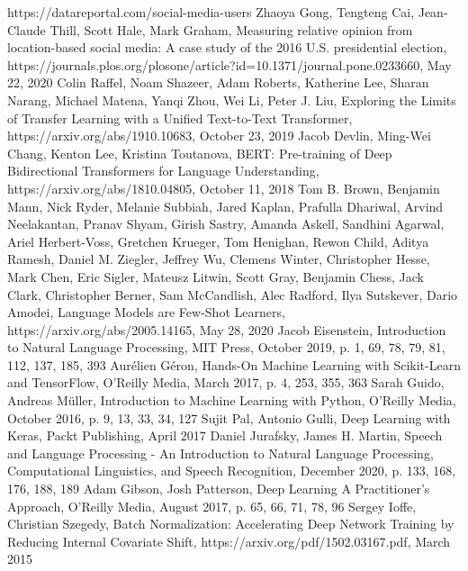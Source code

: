 \documentclass{article}
\begin{document}
\newpage\begin{thebibliography}{10}
https://datareportal.com/social-media-users
Zhaoya Gong, Tengteng Cai, Jean-Claude Thill, Scott Hale, Mark Graham, Measuring relative opinion from location-based social media: A case study of the 2016 U.S. presidential election, https://journals.plos.org/plosone/article?id=10.1371/journal.pone.0233660, May 22, 2020
Colin Raffel, Noam Shazeer, Adam Roberts, Katherine Lee, Sharan Narang, Michael Matena, Yanqi Zhou, Wei Li, Peter J. Liu, Exploring the Limits of Transfer Learning with a Unified Text-to-Text Transformer, https://arxiv.org/abs/1910.10683, October 23, 2019
Jacob Devlin, Ming-Wei Chang, Kenton Lee, Kristina Toutanova, BERT: Pre-training of Deep Bidirectional Transformers for Language Understanding, https://arxiv.org/abs/1810.04805, October 11, 2018
Tom B. Brown, Benjamin Mann, Nick Ryder, Melanie Subbiah, Jared Kaplan, Prafulla Dhariwal, Arvind Neelakantan, Pranav Shyam, Girish Sastry, Amanda Askell, Sandhini Agarwal, Ariel Herbert-Voss, Gretchen Krueger, Tom Henighan, Rewon Child, Aditya Ramesh, Daniel M. Ziegler, Jeffrey Wu, Clemens Winter, Christopher Hesse, Mark Chen, Eric Sigler, Mateusz Litwin, Scott Gray, Benjamin Chess, Jack Clark, Christopher Berner, Sam McCandlish, Alec Radford, Ilya Sutskever, Dario Amodei, Language Models are Few-Shot Learners, https://arxiv.org/abs/2005.14165, May 28, 2020
Jacob Eisenstein, Introduction to Natural Language Processing, MIT Press, October 2019, p. 1, 69, 78, 79, 81, 112, 137, 185, 393
Aurélien Géron, Hands-On Machine Learning with Scikit-Learn and TensorFlow, O'Reilly Media, March 2017, p. 4, 253, 355, 363
Sarah Guido, Andreas Müller, Introduction to Machine Learning with Python, O'Reilly Media, October 2016, p. 9, 13, 33, 34, 127
Sujit Pal, Antonio Gulli, Deep Learning with Keras, Packt Publishing, April 2017
Daniel Jurafsky, James H. Martin, Speech and Language Processing - An Introduction to Natural Language Processing, Computational Linguistics, and Speech Recognition, December 2020, p. 133, 168, 176, 188, 189
Adam Gibson, Josh Patterson, Deep Learning A Practitioner's Approach, O'Reilly Media, August 2017, p. 65, 66, 71, 78, 96
Sergey Ioffe, Christian Szegedy, Batch Normalization: Accelerating Deep Network Training by Reducing Internal Covariate Shift, https://arxiv.org/pdf/1502.03167.pdf, March 2015

\end{thebibliography}
\end{document}
